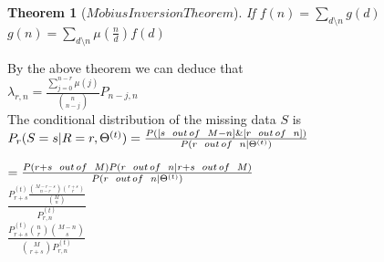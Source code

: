 \documentclass{article}\usepackage[]{graphicx}\usepackage[]{color}
\newtheorem{theorem}{Theorem}
\begin{document}
\begin{theorem}[$M\ddot{o}bius Inversion Theorem$]


If $f(n)=\sum_{d \setminus n}g(d)$\\

    $g(n)=\sum_{d \setminus n}\mu(\frac{n}{d})f(d)$\\
      
\end{theorem}

By the above theorem we can deduce that\\

$\lambda_{r,n}=\frac{\sum_{j=0}^{n-r}\mu(j)}{\binom{n}{n-j}}P_{n-j,n} $\\





The conditional distribution of the missing data $S$ is\\


$P_{r}(S=s|R=r,\Theta^{(t)})=\frac{P([s\hspace{2mm} out \hspace{0.5mm} of \hspace{2mm} M-n] \&[r\hspace{2mm} out \hspace{0.5mm}of \hspace{2mm}n])}{P(r\hspace{2mm} out\hspace{0.5mm} of \hspace{2mm}n|\Theta^{(t)})}$


$=\frac{P(r+s\hspace{2mm} out \hspace{0.5mm} of \hspace{2mm} M)P(r\hspace{2mm} out \hspace{0.5mm}of \hspace{2mm}n|r+s \hspace{2mm} out \hspace{.5mm} of \hspace{2mm}M )}{P(r\hspace{2mm} out\hspace{0.5mm} of \hspace{2mm}n|\Theta^{(t)})}$\\

$\frac{P^{(t)}_{r+s}\frac{\binom{M-r-s}{n-r}\binom{r+s}{r}}{\binom{M}{n}}}{P^{(t)}_{r,n}}$\\


$\frac{P^{(t)}_{r+s}\binom{n}{r}\binom{M-n}{s}}{\binom{M}{r+s}P^{(t)}_{r,n}}$\\
\end{document}
